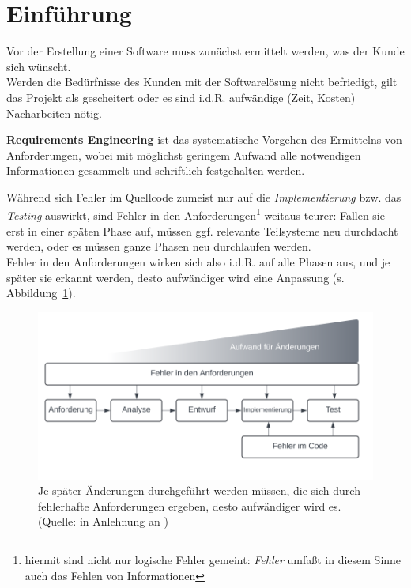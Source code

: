\section{Einführung}

\noindent
Vor der Erstellung einer Software muss zunächst ermittelt werden, was der Kunde sich wünscht.\\
Werden die Bedürfnisse des Kunden mit der Softwarelösung nicht befriedigt, gilt das Projekt als gescheitert oder es sind i.d.R. aufwändige (Zeit, Kosten) Nacharbeiten nötig.\\

\vspace{5mm}
\begin{tcolorbox}
    \textbf{Requirements Engineering} ist das systematische Vorgehen des Ermittelns von Anforderungen,
    wobei mit möglichst geringem Aufwand alle notwendigen Informationen gesammelt und schriftlich festgehalten werden.
\end{tcolorbox}
\vspace{5mm}

\noindent
Während sich Fehler im Quellcode zumeist nur auf die \textit{Implementierung} bzw. das \textit{Testing} auswirkt, sind Fehler in den Anforderungen\footnote{
hiermit sind nicht nur logische Fehler gemeint: \textit{Fehler} umfaßt in diesem Sinne auch das Fehlen von Informationen
} weitaus teurer: Fallen sie erst in einer späten Phase auf, müssen ggf. relevante Teilsysteme neu durchdacht werden, oder es müssen ganze Phasen neu durchlaufen werden.\\
Fehler in den Anforderungen wirken sich also i.d.R. auf alle Phasen aus, und je später sie erkannt werden, desto aufwändiger wird eine Anpassung (s. Abbildung~\ref{fig:aufwand}).

\begin{figure}
    \centering
    \includegraphics[scale=0.4]{part one/Requirements Engineering/img/aufwand}
    \caption{Je später Änderungen durchgeführt werden müssen, die sich durch fehlerhafte Anforderungen ergeben, desto aufwändiger wird es. (Quelle: in Anlehnung an \cite[38 f., Abb. 4.1 und 4.2]{Wed09})}
    \label{fig:aufwand}
\end{figure}

